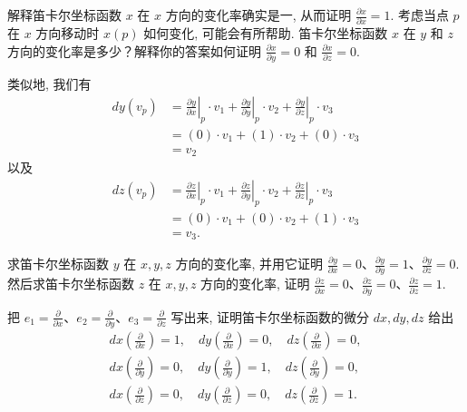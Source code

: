 \begin{question}\label{q:2-11}
解释笛卡尔坐标函数 $x$ 在 $x$ 方向的变化率确实是一, 从而证明 $\frac{\partial x}{\partial x}=1$. 考虑当点 $p$ 在 $x$ 方向移动时 $x(p)$ 如何变化, 可能会有所帮助. 笛卡尔坐标函数 $x$ 在 $y$ 和 $z$ 方向的变化率是多少？解释你的答案如何证明 $\frac{\partial x}{\partial y}=0$ 和 $\frac{\partial x}{\partial z}=0$.
\end{question}

类似地, 我们有
\begin{align*}
dy(v_p)&=\left.\frac{\partial y}{\partial x}\right|_{p}\cdot v_1+\left.\frac{\partial y}{\partial y}\right|_{p}\cdot v_2+\left.\frac{\partial y}{\partial z}\right|_{p}\cdot v_3\\
&=(0)\cdot v_1+(1)\cdot v_2+(0)\cdot v_3\\
&=v_2
\end{align*}
以及
\begin{align*}
dz(v_p)&=\left.\frac{\partial z}{\partial x}\right|_{p}\cdot v_1+\left.\frac{\partial z}{\partial y}\right|_{p}\cdot v_2+\left.\frac{\partial z}{\partial z}\right|_{p}\cdot v_3\\
&=(0)\cdot v_1+(0)\cdot v_2+(1)\cdot v_3\\
&=v_3.
\end{align*}

\begin{question}\label{q:2-12}
求笛卡尔坐标函数 $y$ 在 $x,y,z$ 方向的变化率, 并用它证明 $\frac{\partial y}{\partial x}=0$、$\frac{\partial y}{\partial y}=1$、$\frac{\partial y}{\partial z}=0$. 然后求笛卡尔坐标函数 $z$ 在 $x,y,z$ 方向的变化率, 证明 $\frac{\partial z}{\partial x}=0$、$\frac{\partial z}{\partial y}=0$、$\frac{\partial z}{\partial z}=1$.
\end{question}

\begin{question}\label{q:2-13}
把 $e_1=\frac{\partial}{\partial x}$、$e_2=\frac{\partial}{\partial y}$、$e_3=\frac{\partial}{\partial z}$ 写出来, 证明笛卡尔坐标函数的微分 $dx,dy,dz$ 给出
\begin{align*}
dx\left(\frac{\partial}{\partial x}\right)=1,\quad dy\left(\frac{\partial}{\partial x}\right)=0,\quad dz\left(\frac{\partial}{\partial x}\right)=0, \\
dx\left(\frac{\partial}{\partial y}\right)=0,\quad dy\left(\frac{\partial}{\partial y}\right)=1,\quad dz\left(\frac{\partial}{\partial y}\right)=0, \\
dx\left(\frac{\partial}{\partial z}\right)=0,\quad dy\left(\frac{\partial}{\partial z}\right)=0,\quad dz\left(\frac{\partial}{\partial z}\right)=1.
\end{align*}
\end{question}

